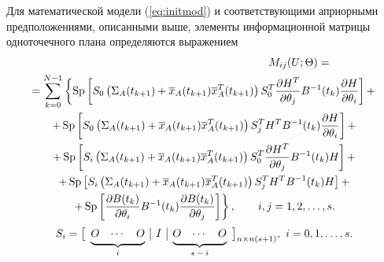 \documentclass[a4paper,14pt]{extarticle}
\DeclareMathOperator{\Sp}{Sp}
\newcommand{\pd}[2]{\frac{\partial #1}{\partial #2}}
\newcommand{\inv}[1]{#1^{-1}}
\begin{document}
\newcommand{\pred}[0]{t_{k+1}|t_{k}}
\newcommand{\est}[0]{t_k|t_k}
\newcommand{\fut}[0]{t_{k+1}}
\newcommand{\upd}[0]{t_{k+1}|t_{k+1}}
\newcommand{\ol}[1]{\overline{#1}}
\newcommand{\Th}[0]{\Theta}

\newcommand{\sumlim}[2]{\sum\limits_{#1}^{#2}}

Для математической модели (\ref{eq:initmod}) и соответствующими априорными
предположениями, описанными выше, элементы информационной матрицы одноточечного
плана определяются выражением
\begin{multline}
	\label{eq:fim}
	\hspace{0.5\textwidth} M_{ij}(U;\Th) =\\
		= \sumlim{k=0}{N-1} \left\{ \Sp \left[ 
		S_0 \left(\Sigma_A(\fut) + \ol{x}_A(\fut) \ol{x}^T_A(\fut) \right)
		S_0^T \pd{H^T}{\theta_j} \inv{B}(t_k) \pd{H}{\theta_i} \right] + \right. \\
		\left.
		+ \Sp\left[ S_0 \left( \Sigma_A(\fut) + \ol{x}_A(\fut)
		\ol{x}_A^T(\fut) \right) S_j^T H^T \inv{B}(t_k) \pd{H}{\theta_i}
		\right] + \right. \\ \left.
		+ \Sp\left[ S_i \left( \Sigma_A(\fut) + \ol{x}_A(\fut) \ol{x}^T_A(\fut)
		\right) S_0^T \pd{H^T}{\theta_j} \inv{B}(t_k) H \right] + \right. \\ \left.
		+ \Sp \left[ S_i \left( \Sigma_A(\fut) + \ol{x}_A(\fut) \ol{x}^T_A(\fut)
		\right) S_j^T H^T \inv{B}(t_k) H \right] + \right. \\ \left.
		+ \Sp \left[ \pd{B(t_k)}{\theta_i} \inv{B}(t_k) \pd{B(t_k)}{\theta_j} 
		\right]  \right\},\qquad i,j = 1,2,\ldots,s.
\end{multline}
\newcommand\undermat[2]{%
	  \makebox[0pt][l]{$\smash{\underbrace{\phantom{%
			    \begin{matrix}#2\end{matrix}}}_{\text{$#1$}}}$}#2}
\[
	S_i = {\left[
	\begin{array}{rrr|r|rrr}
		\undermat{i}{O & \cdots & O} & I & 
			\undermat{s-i}{O & \cdots & O} \\
	\end{array}
	\right]}_{n \times n(s+1)},\ i = 0, 1, \ldots, s.
\]
\end{document}

